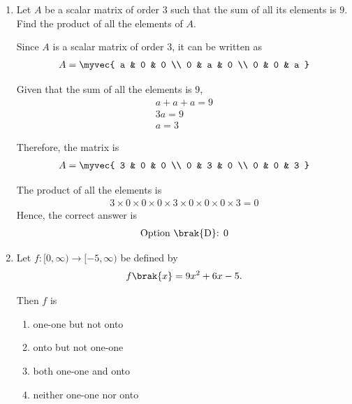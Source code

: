 

\begin{enumerate}[label=\thesubsection.\arabic*, ref=\thesubsection.\theenumi]

\item Let $A$ be a scalar matrix of order $3$ such that the sum
of all its elements is $9$. Find the product of all the
elements of $A$.

\begin{enumerate}
\end{enumerate}
\solution
Since $A$ is a scalar matrix of order $3$, it can be
written as
\begin{align}
A =
\myvec{
a & 0 & 0 \\
0 & a & 0 \\
0 & 0 & a
}
\end{align}

Given that the sum of all the elements is $9$,
\begin{align}
a+a+a=9\\
3a=9\\
a=3
\end{align}

Therefore, the matrix is
\begin{align}
A =
\myvec{
3 & 0 & 0 \\
0 & 3 & 0 \\
0 & 0 & 3
}
\end{align}

The product of all the elements is
\begin{align}
3 \times 0 \times 0 \times
0 \times 3 \times 0 \times
0 \times 0 \times 3=0
\end{align}
Hence, the correct answer is
\begin{align}
\text{Option \brak{D}: }0
\end{align}


\item 
Let $f:[0,\infty)\rightarrow[-5,\infty)$ be defined by
\begin{align}
f\brak{x}=9x^2+6x-5.
\end{align}

Then $f$ is

\begin{enumerate}
    \item one-one but not onto
    \item onto but not one-one
    \item both one-one and onto
    \item neither one-one nor onto


\end{enumerate}
\end{enumerate}
